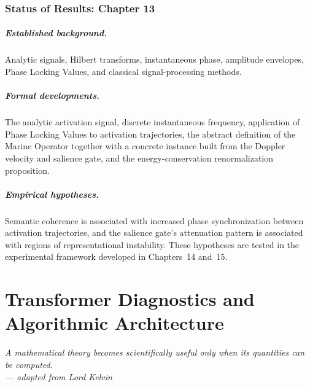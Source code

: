 \documentclass[11pt,twoside,openright]{book}
\numberwithin{equation}{chapter}
\theoremstyle{definition}
\theoremstyle{plain}
\theoremstyle{remark}
\theoremstyle{definition}
\begin{document}
\subsection*{Status of Results: Chapter 13}

\paragraph{Established background.} Analytic signals, Hilbert transforms,
instantaneous phase, amplitude envelopes, Phase Locking Values, and
classical signal-processing methods.

\paragraph{Formal developments.} The analytic activation signal, discrete
instantaneous frequency, application of Phase Locking Values to
activation trajectories, the abstract definition of the Marine Operator
together with a concrete instance built from the Doppler velocity and
salience gate, and the energy-conservation renormalization proposition.

\paragraph{Empirical hypotheses.} Semantic coherence is associated with
increased phase synchronization between activation trajectories, and the
salience gate's attenuation pattern is associated with regions of
representational instability. These hypotheses are tested in the
experimental framework developed in Chapters~14 and~15.

\chapter{Transformer Diagnostics and Algorithmic Architecture}
\label{ch:diagnostics}

\vspace{1em}
\begin{flushright}\itshape
A mathematical theory becomes scientifically useful only when its
quantities can be computed.\\
\upshape --- adapted from Lord Kelvin
\end{flushright}
\vspace{1em}
\end{document}
